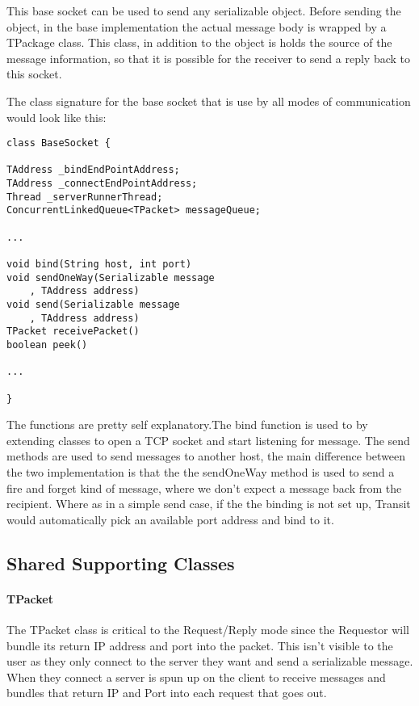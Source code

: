 \documentclass[11pt,journal,compsoc]{IEEEtran}
\begin{document}
This base socket can be used to send any serializable object. Before sending the object, in the base implementation the actual message body is wrapped by a TPackage class. This class, in addition to the object is holds the source of the message information, so that it is possible for the receiver to send a reply back to this socket.

The class signature for the base socket that is use by all modes of communication would look like this:
\begin{lstlisting}
class BaseSocket {

TAddress _bindEndPointAddress;
TAddress _connectEndPointAddress;
Thread _serverRunnerThread;
ConcurrentLinkedQueue<TPacket> messageQueue;

...

void bind(String host, int port)
void sendOneWay(Serializable message
    , TAddress address)
void send(Serializable message
    , TAddress address)
TPacket receivePacket()
boolean peek()

...

}

\end{lstlisting}


The functions are pretty self explanatory.The bind function is used to by extending classes to open a TCP socket and start listening for message. The send methods are used to send messages to another host, the main difference between the two implementation is that the the sendOneWay method is used to send a fire and forget kind of message, where we don't expect a message back from the recipient. Where as in a simple send case, if the the binding is not set up, Transit would automatically pick an available port address and bind to it.

\subsection{Shared Supporting Classes}

\paragraph{TPacket}
The TPacket class is critical to the Request/Reply mode since the Requestor will bundle its return IP address and port into the packet. This isn't visible to the user as they only connect to the server they want and send a serializable message. When they connect a server is spun up on the client to receive messages and bundles that return IP and Port into each request that goes out.
\end{document}
